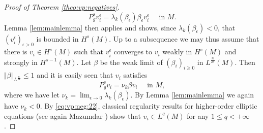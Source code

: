 \documentclass[10pt]{amsart}
\numberwithin{equation}{section}
\theoremstyle{plain}
\theoremstyle{remark}
\begin{document}
\begin{proof}[Proof of Theorem \ref{theo:vp:negatives}]
 $$ P_g^s v_i^{\epsilon} = \lambda_k(\beta_\epsilon) \beta_{\epsilon} v_i^{\epsilon} \quad \text{ in } M .$$
 Lemma \ref{lem:mainlemma} then applies and shows, since $\lambda_k(\beta_\epsilon) <0$, that $(v_i^{\epsilon})_{\epsilon >0}$ is bounded in $H^s(M)$. Up to a subsequence we may thus assume that there is $v_i \in H^s(M)$ such that $v_i^{\epsilon}$ converges to $v_i $ weakly in $H^s(M)$ and strongly in $H^{s-1}(M)$. Let $\beta$ be the weak limit of $(\beta_i)_{i \ge0}$ in $L^{\frac{n}{2s}}(M)$. Then $\Vert \beta \Vert_{L^{\frac{n}{2s}}} \le 1$ and it is easily seen that $v_i $ satisfies 
 \begin{equation} \label{eq:vp:neg:22}
  P_g^s v_i  =\nu_k \beta v_i \quad \text{ in } M ,
  \end{equation}
 where we have let $\nu_k = \lim_{\epsilon \to 0} \lambda_k(\beta_{\epsilon})$. By Lemma \ref{lem:mainlemma} we again have $\nu_k <0$. By \eqref{eq:vp:neg:22}, classical regularity results for higher-order elliptic equations (see again Mazumdar \cite[Theorem 5]{Mazumdar1}) show that $v_i \in L^q(M)$ for any $1 \le q < + \infty$.  
 
 \medskip
 

\end{proof}
\end{document}
